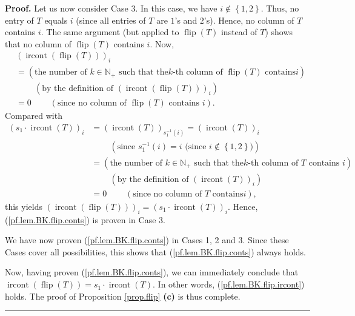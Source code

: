 \documentclass[numbers=enddot,12pt,final,onecolumn,notitlepage]{scrartcl}%
\theoremstyle{definition}
\newenvironment{proof}[1][Proof]{\noindent\textbf{#1.} }{\ \rule{0.5em}{0.5em}}
\begin{document}
\begin{proof}
Let us now consider Case 3. In this case, we have $i\notin\left\{
1,2\right\}  $. Thus, no entry of $T$ equals $i$ (since all entries of $T$ are
$1$'s and $2$'s). Hence, no column of $T$ contains $i$. The same argument (but
applied to $\operatorname*{flip}\left(  T\right)  $ instead of $T$) shows that
no column of $\operatorname*{flip}\left(  T\right)  $ contains $i$. Now,%
\begin{align*}
&  \left(  \operatorname*{ircont}\left(  \operatorname*{flip}\left(  T\right)
\right)  \right)  _{i}\\
&  =\left(  \text{the number of }k\in\mathbb{N}_{+}\text{ such that the
}k\text{-th column of }\operatorname*{flip}\left(  T\right)  \text{ contains
}i\right) \\
&  \ \ \ \ \ \ \ \ \ \ \left(  \text{by the definition of }\left(
\operatorname*{ircont}\left(  \operatorname*{flip}\left(  T\right)  \right)
\right)  _{i}\right) \\
&  =0\ \ \ \ \ \ \ \ \ \ \left(  \text{since no column of }%
\operatorname*{flip}\left(  T\right)  \text{ contains }i\right)  .
\end{align*}
Compared with%
\begin{align*}
\left(  s_{1}\cdot\operatorname*{ircont}\left(  T\right)  \right)  _{i}  &
=\left(  \operatorname*{ircont}\left(  T\right)  \right)  _{s_{1}^{-1}\left(
i\right)  }=\left(  \operatorname*{ircont}\left(  T\right)  \right)  _{i}\\
&  \ \ \ \ \ \ \ \ \ \ \left(  \text{since }s_{1}^{-1}\left(  i\right)
=i\text{ (since }i\notin\left\{  1,2\right\}  \text{)}\right) \\
&  =\left(  \text{the number of }k\in\mathbb{N}_{+}\text{ such that the
}k\text{-th column of }T\text{ contains }i\right) \\
&  \ \ \ \ \ \ \ \ \ \ \left(  \text{by the definition of }\left(
\operatorname*{ircont}\left(  T\right)  \right)  _{i}\right) \\
&  =0\ \ \ \ \ \ \ \ \ \ \left(  \text{since no column of }T\text{ contains
}i\right)  ,
\end{align*}
this yields $\left(  \operatorname*{ircont}\left(  \operatorname*{flip}\left(
T\right)  \right)  \right)  _{i}=\left(  s_{1}\cdot\operatorname*{ircont}%
\left(  T\right)  \right)  _{i}$. Hence, (\ref{pf.lem.BK.flip.conts}) is
proven in Case 3.

We have now proven (\ref{pf.lem.BK.flip.conts}) in Cases 1, 2 and 3. Since
these Cases cover all possibilities, this shows that
(\ref{pf.lem.BK.flip.conts}) always holds.

Now, having proven (\ref{pf.lem.BK.flip.conts}), we can immediately conclude
that $\operatorname*{ircont}\left(  \operatorname*{flip}\left(  T\right)
\right)  =s_{1}\cdot\operatorname*{ircont}\left(  T\right)  $. In other words,
(\ref{pf.lem.BK.flip.ircont}) holds. The proof of Proposition \ref{prop.flip}
\textbf{(c)} is thus complete.
\end{proof}
\end{document}

